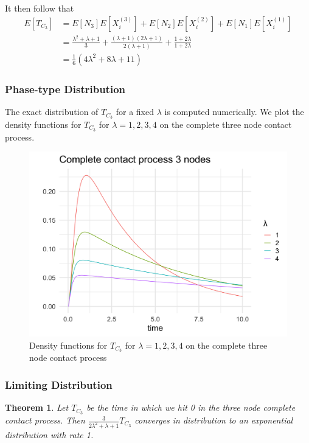 \documentclass{article}
\theoremstyle{plain}
\newtheorem{theorem}{Theorem}[section]
\theoremstyle{definition}
\theoremstyle{remark}
\numberwithin{equation}{section}
\begin{document}
It then follow that
\begin{align*}
        E[T_{C_3}] &= E[N_3] E[X_i^{(3)}] + E[N_2] E[X_i^{(2)}] + E[N_1] E[X_i^{(1)}]\\
        &= \frac{\lambda^2 + \lambda + 1}{3} + \frac{(\lambda + 1)(2 \lambda + 1)}{2 (\lambda + 1)} + \frac{1 + 2\lambda}{1 + 2 \lambda}\\
        &= \frac{1}{6}(4 \lambda^2 + 8 \lambda + 11)
\end{align*}

\subsubsection{Phase-type Distribution}

The exact distribution of $T_{C_3}$ for a fixed $\lambda$ is computed numerically.
We plot the density functions for $T_{C_3}$ for $\lambda = 1, 2, 3, 4$ on the complete three node contact process.

\begin{figure}[H]
  \centering
    \includegraphics[width=.80\textwidth]{figures/complete_3_contact_phase_densities.png}
   \caption{Density functions for $T_{C_3}$ for $\lambda = 1, 2, 3, 4$ on the complete three node contact process}
  \label{fig:contact_3_phase_densities}
\end{figure}

\subsubsection{Limiting Distribution}

\begin{theorem}
Let $T_{C_3}$ be the time in which we hit 0 in the three node complete contact process.
Then $\frac{3}{2 \lambda^2 + \lambda + 1} T_{C_3}$ converges in distribution to an exponential distribution with rate 1.
\end{theorem}
\end{document}
